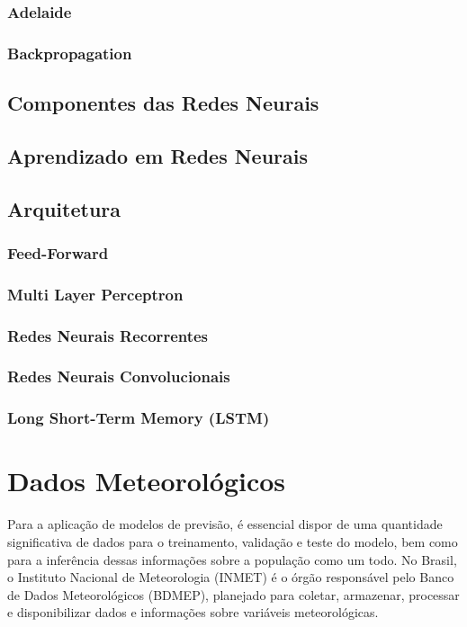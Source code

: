         \subsubsection{Adelaide}

        \subsubsection{Backpropagation}
      
        
    \subsection{Componentes das Redes Neurais}

    \subsection{Aprendizado em Redes Neurais}
    \subsection{Arquitetura}
        \subsubsection{Feed-Forward}
        \subsubsection{Multi Layer Perceptron}
        \subsubsection{Redes Neurais Recorrentes}
        \subsubsection{Redes Neurais Convolucionais}
        \subsubsection{Long Short-Term Memory (LSTM)}


\section{Dados Meteorológicos}

    Para a aplicação de modelos de previsão, é essencial dispor de uma quantidade significativa de dados para o 
    treinamento, validação e teste do modelo, bem como para a inferência dessas informações sobre a população como um 
    todo. No Brasil, o Instituto Nacional de Meteorologia (INMET) é o órgão responsável pelo Banco de Dados 
    Meteorológicos (BDMEP), planejado para coletar, armazenar, processar e disponibilizar dados e informações sobre 
    variáveis meteorológicas. 
    
